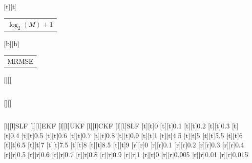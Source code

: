 %    
%
%
\begin{psfrags}%
\psfragscanon%
%
[t][t]{\color[rgb]{0,0,0}\setlength{\tabcolsep}{0pt}\begin{tabular}{c}$\log_2 (M) + 1$\end{tabular}}%
[b][b]{\color[rgb]{0,0,0}\setlength{\tabcolsep}{0pt}\begin{tabular}{c}MRMSE\end{tabular}}%
[][]{\color[rgb]{0,0,0}\setlength{\tabcolsep}{0pt}\begin{tabular}{c} \end{tabular}}%
[][]{\color[rgb]{0,0,0}\setlength{\tabcolsep}{0pt}\begin{tabular}{c} \end{tabular}}%
[l][l]{\color[rgb]{0,0,0}SLF}%
[l][l]{\color[rgb]{0,0,0}EKF}%
[l][l]{\color[rgb]{0,0,0}UKF}%
[l][l]{\color[rgb]{0,0,0}CKF}%
[l][l]{\color[rgb]{0,0,0}SLF}%
%
[t][t]{0}%
[t][t]{0.1}%
[t][t]{0.2}%
[t][t]{0.3}%
[t][t]{0.4}%
[t][t]{0.5}%
[t][t]{0.6}%
[t][t]{0.7}%
[t][t]{0.8}%
[t][t]{0.9}%
[t][t]{1}%
[t][t]{4.5}%
[t][t]{5}%
[t][t]{5.5}%
[t][t]{6}%
[t][t]{6.5}%
[t][t]{7}%
[t][t]{7.5}%
[t][t]{8}%
[t][t]{8.5}%
[t][t]{9}%
%
[r][r]{0}%
[r][r]{0.1}%
[r][r]{0.2}%
[r][r]{0.3}%
[r][r]{0.4}%
[r][r]{0.5}%
[r][r]{0.6}%
[r][r]{0.7}%
[r][r]{0.8}%
[r][r]{0.9}%
[r][r]{1}%
[r][r]{0}%
[r][r]{0.005}%
[r][r]{0.01}%
[r][r]{0.015}%
%

\end{psfrags}
